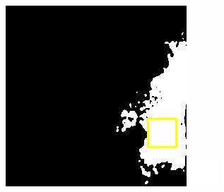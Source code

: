 \documentclass[10pt,UTF8,fntef]{ctexart}
\begin{document}
\begin{figure}[H]
{{\begin{minipage}[b]{0.15\linewidth}
            \includegraphics[width=1\linewidth]{../log/spoon3/cut/LC81570452014213LGN00_06142_unet.jpg}\vspace{4pt}
            \includegraphics[width=1\linewidth]{../log/spoon3/cut/tmp_cut_LC81570452014213LGN00_06142_unet.jpg}\vspace{4pt}

\end{minipage}}}
\end{figure}
\end{document}
